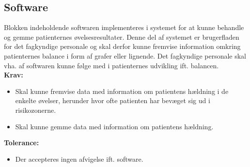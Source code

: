 \subsection{Software}\label{subsec:software}
Blokken indeholdende softwaren implementeres i systemet for at kunne behandle og gemme patienternes øvelsesresultater. Denne del af systemet er brugerfladen for det fagkyndige personale og skal derfor kunne fremvise information omkring patienternes balance i form af grafer eller lignende. Det fagkyndige personale skal vha. af softwaren kunne følge med i patienternes udvikling ift. balancen. \\
\textbf{Krav:}
\begin{itemize}
	\item Skal kunne fremvise data med information om patientens hældning i de enkelte øvelser, herunder hvor ofte patienten har bevæget sig ud i risikozonerne. 
	\item Skal kunne gemme data med information om patientens hældning.
\end{itemize}
\textbf{Tolerance:}
\begin{itemize}
	\item Der accepteres ingen afvigelse ift. software. 
\end{itemize}